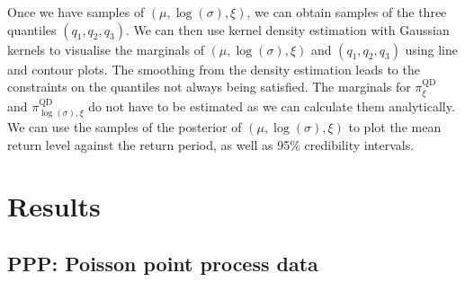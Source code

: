 \documentclass{article}
\begin{document}
%
Once we have samples of $(\mu, \log(\sigma), \xi)$,
we can obtain samples of the three quantiles $(q_1, q_2, q_3)$.
We can then use kernel density estimation with Gaussian kernels
to visualise the marginals of $(\mu, \log(\sigma), \xi)$ and $(q_1, q_2, q_3)$
using line and contour plots.
The smoothing from the density estimation leads to the constraints
on the quantiles not always being satisfied.
The marginals for $\pi_\xi^{\text{QD}}$ and $\pi_{\log(\sigma), \xi}^{\text{QD}}$
do not have to be estimated as we can calculate them analytically.
We can use the samples of the posterior of $(\mu, \log(\sigma), \xi)$
to plot the mean return level against the return period,
as well as 95\% credibility intervals.
%
\section{Results}
\label{section:studies}
%
\subsection{PPP: Poisson point process data}
%	
\end{document}
